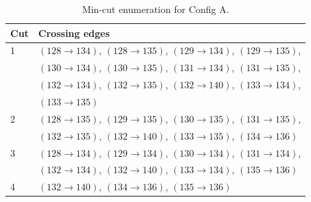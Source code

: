 \documentclass[12pt]{report}
\begin{document}
\begin{table}[htbp]
\centering
\caption{Min-cut enumeration for Config A.}
\label{tab:mincut_enumeration_config_a}
\begin{tabular}{lp{10cm}}
\toprule
Cut & Crossing edges \\
\midrule
1 & $(128\rightarrow134)$, $(128\rightarrow135)$, $(129\rightarrow134)$, $(129\rightarrow135)$, \\
  & $(130\rightarrow134)$, $(130\rightarrow135)$, $(131\rightarrow134)$, $(131\rightarrow135)$, \\
  & $(132\rightarrow134)$, $(132\rightarrow135)$, $(132\rightarrow140)$, $(133\rightarrow134)$, \\
  & $(133\rightarrow135)$ \\
\midrule
2 & $(128\rightarrow135)$, $(129\rightarrow135)$, $(130\rightarrow135)$, $(131\rightarrow135)$, \\
  & $(132\rightarrow135)$, $(132\rightarrow140)$, $(133\rightarrow135)$, $(134\rightarrow136)$ \\
\midrule
3 & $(128\rightarrow134)$, $(129\rightarrow134)$, $(130\rightarrow134)$, $(131\rightarrow134)$, \\
  & $(132\rightarrow134)$, $(132\rightarrow140)$, $(133\rightarrow134)$, $(135\rightarrow136)$ \\
\midrule
4 & $(132\rightarrow140)$, $(134\rightarrow136)$, $(135\rightarrow136)$ \\
\bottomrule
\end{tabular}
\end{table}
\end{document}

